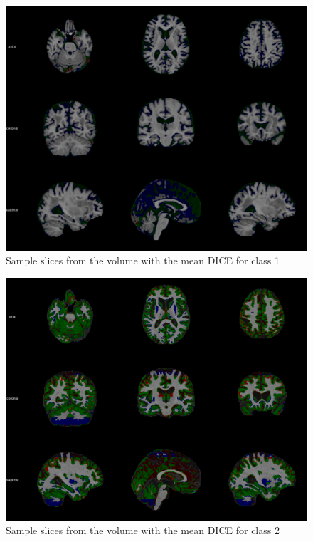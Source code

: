 \documentclass[msc]{infthesis}
\begin{document}
\begin{figure}[ht]
  \centering
  \includegraphics[width=\textwidth]{images/class_1_mean}
  \caption{Sample slices from the volume with the mean DICE for class 1}
  \label{fig:overall-mean-1}
\end{figure}


\begin{figure}[ht]
  \centering
  \includegraphics[width=\textwidth]{images/class_2_mean}
  \caption{Sample slices from the volume with the mean DICE for class 2}
  \label{fig:overall-mean-2}
\end{figure}
\end{document}
